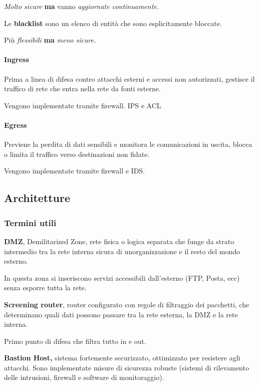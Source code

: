 \emph{Molto sicure} \textbf{ma} vanno \emph{aggiornate continuamente.}

Le \textbf{blacklist} sono un elenco di entità che sono esplicitamente
bloccate.

Più \emph{flessibili} \textbf{ma} \emph{meno sicure.}

\paragraph{Ingress}\label{ingress}

Prima a linea di difesa contro attacchi esterni e accessi non
autorizzati, gestisce il traffico di rete che entra nella rete da fonti
esterne.

Vengono implementate tramite firewall. IPS e ACL

\paragraph{Egress}\label{egress}

Previene la perdita di dati sensibili e monitora le comunicazioni in
uscita, blocca o limita il traffico verso destinazioni non fidate.

Vengono implementate tramite firewall e IDS.

\subsection{Architetture}\label{architetture}

\subsubsection{Termini utili}\label{termini-utili}

\textbf{DMZ}, Demilitarized Zone, rete fisica o logica separata che
funge da strato intermedio tra la rete interna sicura di
un\textquotesingle organizzazione e il resto del mondo esterno.

In questa zona si inseriscono servizi accessibili dall'esterno (FTP,
Posta, ecc) senza esporre tutta la rete.

\textbf{Screening router}, router configurato con regole di filtraggio
dei pacchetti, che determinano quali dati possono passare tra la rete
esterna, la DMZ e la rete interna.

Primo punto di difesa che filtra tutto in e out.

\textbf{Bastion Host,} sistema fortemente securizzato, ottimizzato per
resistere agli attacchi. Sono implementate misure di sicurezza robuste
(sistemi di rilevamento delle intrusioni, firewall e software di
monitoraggio).

